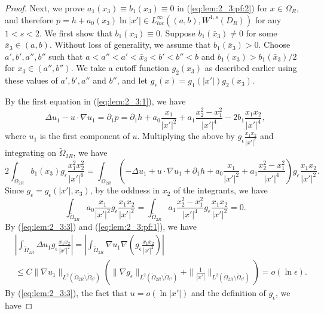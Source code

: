 \documentclass[12pt]{article}
\begin{document}
\begin{proof}
	Next, we prove $a_1(x_3)\equiv b_1(x_3)\equiv 0$ in (\ref{eq:lem:2_3:pf:2}) for $x\in \Omega_{R}$, and therefore $p=h+a_0(x_3)\ln |x'|\in L^{\infty}_{loc}((a, b), W^{1, s}(D_R))$ for any $1< s<2$. We first show that $b_1(x_3)\equiv 0$. Suppose $b_1(\bar{x}_3)\ne 0$ for some $\bar{x}_3\in (a, b)$. Without loss of generality, we assume that $b_1(\bar{x}_3)>0$. Choose $a', b', a'', b''$ such that $a<a''<a'<\bar{x}_3<b'<b''<b$ and $b_1(x_3)>b_1(\bar{x}_3)/2$ for $x_3\in (a'', b'')$. We take a cutoff function $g_2(x_3)$ as described earlier using these values of $a', b', a''$ and $b''$, and let $g_{\epsilon}(x)=g_1(|x'|)g_2(x_3)$. 
	
	By the first equation in (\ref{eq:lem:2_3:1}), we have 
	\[
		\Delta u_1-u\cdot\nabla u_1=\partial_1p=\partial_1h+a_0\frac{x_1}{|x'|^2}+a_1\frac{x_2^2-x_1^2}{|x'|^4}-2b_1\frac{x_1x_2}{|x'|^4}, 
	\]
	where $u_1$ is the first component of $u$. Multiplying the above by $g_{\epsilon}\frac{x_1x_2}{|x'|^2}$ and integrating on $\tilde{\Omega}_{2R}$, we have 
	\begin{equation}\label{eq:lem:2_3:pf:3}
		2\int_{\tilde{\Omega}_{2R}} b_1(x_3)g_{\epsilon}\frac{x_1^2x_2^2}{|x'|^6}= 
		\int_{\tilde{\Omega}_{2R}}(-\Delta u_1+u\cdot\nabla u_1+\partial_1h+a_0\frac{x_1}{|x'|^2}+a_1\frac{x_2^2-x_1^2}{|x'|^4})g_{\epsilon}\frac{x_1x_2}{|x'|^2}. 
	\end{equation}
	Since $g_{\epsilon}=g_{\epsilon}(|x'|, x_3)$, by the oddness in $x_2$ of the integrants, we have 
	\begin{equation*}
		\int_{\tilde{\Omega}_{2R}}a_0\frac{x_1}{|x'|^2}g_{\epsilon}\frac{x_1x_2}{|x'|^2}= \int_{\tilde{\Omega}_{2R}} a_1\frac{x_2^2-x_1^2}{|x'|^4}g_{\epsilon}\frac{x_1x_2}{|x'|^2}=0. 
	\end{equation*}
	By (\ref{eq:lem:2_3:3}) and (\ref{eq:lem:2_3:pf:1}), we have 
	\begin{equation*}
	\begin{split}
		& |\int_{\tilde{\Omega}_{2R}}\Delta u_1g_{\epsilon}\frac{x_1x_2}{|x'|^2}| =| \int_{\tilde{\Omega}_{2R}} \nabla u_1\nabla (g_{\epsilon}\frac{x_1x_2}{|x'|^2})|\\
		& \le C\|\nabla u_1\|_{L^2(\tilde{\Omega}_{2R}\setminus\tilde{\Omega}_{\epsilon^2})}(\|\nabla g_{\epsilon}\|_{L^2(\tilde{\Omega}_{2R}\setminus\tilde{\Omega}_{\epsilon^2})}+\|\frac{1}{|x'|}\|_{L^2(\tilde{\Omega}_{2R}\setminus\tilde{\Omega}_{\epsilon^2})})=o(\ln \epsilon).
	\end{split}
	\end{equation*}
	By (\ref{eq:lem:2_3:3}), the fact that $u=o(\ln |x'|)$ and the definition of $g_{\epsilon}$, we have 

\end{proof}
\end{document}
